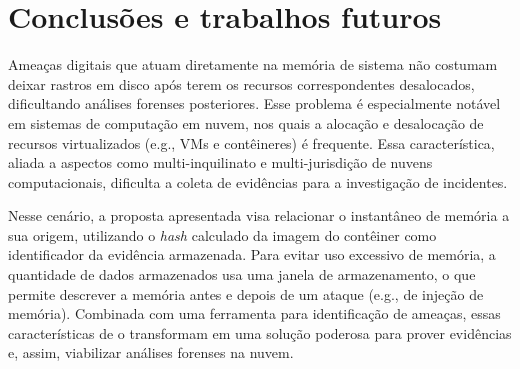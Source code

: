 \section{Conclusões e trabalhos futuros}
\label{sec:proposta-concl}

%
Ameaças digitais que atuam diretamente na memória de sistema não costumam deixar rastros em disco após terem os recursos correspondentes desalocados, dificultando análises forenses posteriores.
%
Esse problema é especialmente notável em sistemas de computação em nuvem, nos quais a alocação e desalocação de recursos virtualizados (e.g., VMs e contêineres) é frequente.
%
Essa característica, aliada a aspectos como multi-inquilinato e multi-jurisdição de nuvens computacionais, dificulta a coleta de evidências para a investigação de incidentes.


Nesse cenário, a proposta apresentada visa relacionar o instantâneo de memória a sua origem, utilizando o \textit{hash} calculado da imagem do contêiner como identificador da evidência armazenada.
%
Para evitar uso excessivo de memória, a quantidade de dados armazenados usa uma janela de armazenamento, o que permite descrever a memória antes e depois de um ataque (e.g., de injeção de memória). 
%
Combinada com uma ferramenta para identificação de ameaças, essas características de \fancyname o transformam em uma solução poderosa para prover evidências e, assim, viabilizar análises forenses na nuvem.
%
%
%

